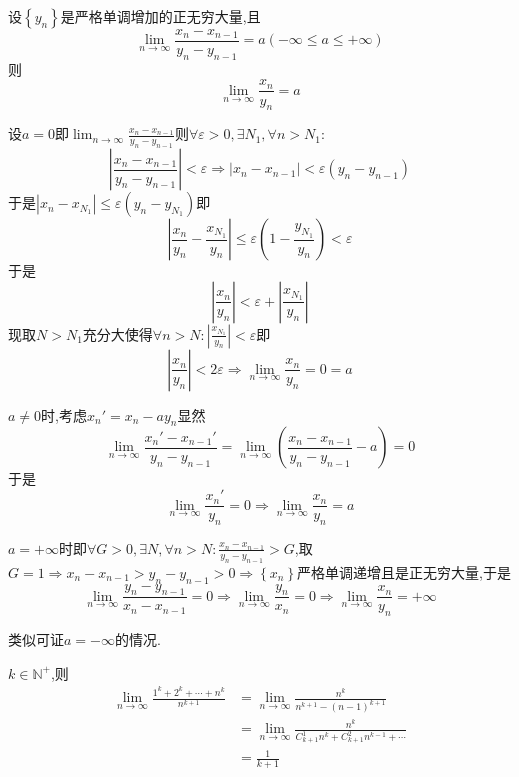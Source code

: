 \begin{formal}
    \begin{theorem}[Stolz定理]\label{thm:Stolz定理}
        设$\left\{y_n\right\}$是严格单调增加的正无穷大量,且\[
        \lim_{n\to\infty}   \frac{
            x_n-x_{n-1}
        }{y_n-y_{n-1}}=a\left(
            -\infty\leqslant a\leqslant +\infty
        \right)
        \]则\[
        \lim_{n\to\infty}\frac{x_n}{y_n}=a
        \]
    \end{theorem}
    \begin{Proof}
        设$a=0$即$\displaystyle \lim_{n\to\infty}\frac{
            x_n-x_{n-1}
        }{y_n-y_{n-1}}$则$\forall\varepsilon>0,\exists N_1,\forall n>N_1:$\[
        \left|
            \frac{
                x_n-x_{n-1}
            }{y_n-y_{n-1}}
        \right|<\varepsilon\Longrightarrow \left|x_n-x_{n-1}\right|<\varepsilon\left(y_n-y_{n-1}\right)
        \]于是$\left|x_n-x_{N_1}\right|\leqslant\varepsilon\left(y_n-y_{N_1}\right)$即\[
        \left|
            \frac{x_n}{y_n}-\frac{x_{N_1}}{y_n}
        \right|\leqslant\varepsilon\left(1-\frac{y_{N_1}}{y_n}\right)<\varepsilon
        \]于是\[
        \left|
            \frac{x_n}{y_n}
        \right|<\varepsilon+\left|
            \frac{x_{N_1}}{y_{n}}
        \right|
        \]现取$N>N_1$充分大使得$\forall n>N:\displaystyle \left|\frac{x_{N_1}}{y_n}\right|<\varepsilon$即\[
        \left|\frac{x_n}{y_n}\right|<2\varepsilon\Longrightarrow \lim_{n\to\infty}\frac{x_n}{y_n}=0=a
        \]

        $a\neq0$时,考虑$x_n'=x_n-ay_n$显然\[
        \lim_{n\to\infty}\frac{
            x_n'-x_{n-1}'
        }{
            y_n-y_{n-1}
        }=\lim_{n\to\infty}\left(
            \frac{x_n-x_{n-1}}{y_n-y_{n-1}}-a
        \right)=0
        \]于是\[
        \lim_{n\to\infty}\frac{x_n'}{y_n}=0\Longrightarrow \lim_{n\to\infty}\frac{x_n}{y_n}=a
        \]

        $a=+\infty$时即$\displaystyle \forall G>0,\exists N,\forall n>N:\frac{x_n-x_{n-1}}{y_n-y_{n-1}}>G$,取$G=1\Longrightarrow x_n-x_{n-1}>y_n-y_{n-1}>0\Longrightarrow\left\{x_n\right\}$严格单调递增且是正无穷大量,于是\[
        \lim_{n\to\infty}\frac{y_n-y_{n-1}}{x_n-x_{n-1}}=0\Longrightarrow \lim_{n\to\infty}\frac{y_n}{x_n}=0\Longrightarrow \lim_{n\to\infty}\frac{x_n}{y_n}=+\infty
        \]

        类似可证$a=-\infty$的情况.
    \end{Proof}
\end{formal}
\begin{brown}
    \begin{example}
        $k\in\mathbb{N}^+$,则
        \begin{align}
            \lim_{n\to\infty}\frac{1^k+2^k+\cdots+n^k}{n^{k+1}}&=\lim_{n\to\infty}\frac{n^k}{n^{k+1}-\left(n-1\right)^{k+1}}\\
            &=\lim_{n\to\infty}\frac{n^k}{
                C^1_{k+1}n^{k}+C^2_{k+1}n^{k-1}+\cdots
            }\\
            &=\frac{1}{k+1}
        \end{align}
    \end{example}
\end{brown}
